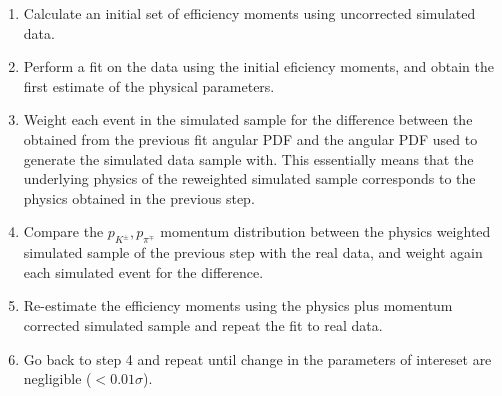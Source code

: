 \begin{enumerate}
\item Calculate an initial set of efficiency moments using uncorrected \BsJpsiKst simulated data.
\item Perform a fit on the \BsJpsiKst data using the initial eficiency moments, and obtain the first estimate of the physical parameters.
\item Weight each event in the simulated sample for the difference between the obtained from the previous fit angular PDF and the angular PDF used to 
      generate the simulated data sample with. 
      This essentially means that the underlying physics of the reweighted simulated  sample corresponds to the physics obtained in the previous step.
\item Compare the $p_{K^{\pm}},p_{\pi^{\mp}}$ momentum distribution between the physics weighted simulated sample of the previous step with the 
      real data, and weight again each simulated event for the difference.
\item Re-estimate the efficiency moments using the physics plus momentum corrected \BsJpsiKst simulated sample and repeat the fit to \BsJpsiKst real data.
\item Go back to step 4 and repeat until change in the parameters of intereset are negligible ($<0.01\sigma$).
\end{enumerate} 

